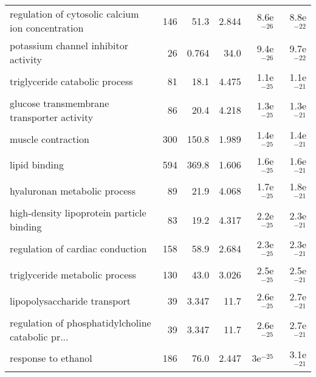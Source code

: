 \begin{longtable}{lrrrrr}
 regulation of cytosolic calcium ion concentration &                     146 &                    51.3 &      2.844 &         8.6e$^{-26}$ &         8.8e$^{-22}$ \\
              potassium channel inhibitor activity &                      26 &                   0.764 &       34.0 &         9.4e$^{-26}$ &         9.7e$^{-22}$ \\
                    triglyceride catabolic process &                      81 &                    18.1 &      4.475 &         1.1e$^{-25}$ &         1.1e$^{-21}$ \\
        glucose transmembrane transporter activity &                      86 &                    20.4 &      4.218 &         1.3e$^{-25}$ &         1.3e$^{-21}$ \\
                                muscle contraction &                     300 &                   150.8 &      1.989 &         1.4e$^{-25}$ &         1.4e$^{-21}$ \\
                                     lipid binding &                     594 &                   369.8 &      1.606 &         1.6e$^{-25}$ &         1.6e$^{-21}$ \\
                      hyaluronan metabolic process &                      89 &                    21.9 &      4.068 &         1.7e$^{-25}$ &         1.8e$^{-21}$ \\
         high-density lipoprotein particle binding &                      83 &                    19.2 &      4.317 &         2.2e$^{-25}$ &         2.3e$^{-21}$ \\
                  regulation of cardiac conduction &                     158 &                    58.9 &      2.684 &         2.3e$^{-25}$ &         2.3e$^{-21}$ \\
                    triglyceride metabolic process &                     130 &                    43.0 &      3.026 &         2.5e$^{-25}$ &         2.5e$^{-21}$ \\
                      lipopolysaccharide transport &                      39 &                   3.347 &       11.7 &         2.6e$^{-25}$ &         2.7e$^{-21}$ \\
 regulation of phosphatidylcholine catabolic pr... &                      39 &                   3.347 &       11.7 &         2.6e$^{-25}$ &         2.7e$^{-21}$ \\
                               response to ethanol &                     186 &                    76.0 &      2.447 &           3e$^{-25}$ &         3.1e$^{-21}$ \\

\end{longtable}
